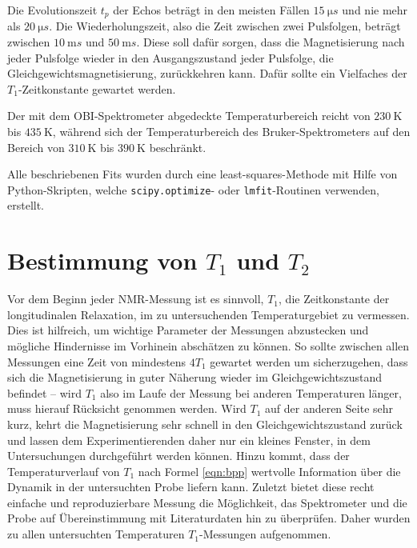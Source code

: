 Die Evolutionszeit $t_p$ der Echos beträgt in den meisten Fällen $\SI{15}{\micro s}$ und nie mehr als $\SI{20}{\micro s}$. Die Wiederholungszeit, also die Zeit zwischen zwei Pulsfolgen, beträgt zwischen $\SI{10}{\milli s}$ und $\SI{50}{\milli s}$. Diese soll dafür sorgen, dass die Magnetisierung nach jeder Pulsfolge wieder in den Ausgangszustand jeder Pulsfolge, die Gleichgewichtsmagnetisierung, zurückkehren kann. Dafür sollte ein Vielfaches der $T_1$-Zeitkonstante gewartet werden.

Der mit dem OBI-Spektrometer abgedeckte Temperaturbereich reicht von $\SI{230}{\kelvin}$ bis $\SI{435}{\kelvin}$, während sich der Temperaturbereich des Bruker-Spektrometers auf den Bereich von $\SI{310}{\kelvin}$ bis $\SI{390}{\kelvin}$ beschränkt.

Alle beschriebenen Fits wurden durch eine least-squares-Methode mit Hilfe von Python-Skripten, welche \texttt{scipy.optimize}- oder \texttt{lmfit}-Routinen verwenden, erstellt.


\section{Bestimmung von $T_1$ und $T_2$} \label{section:res:T_1}

Vor dem Beginn jeder NMR-Messung ist es sinnvoll, $T_1$, die Zeitkonstante der longitudinalen Relaxation, im zu untersuchenden Temperaturgebiet zu vermessen. Dies ist hilfreich, um wichtige Parameter der Messungen abzustecken und mögliche Hindernisse im Vorhinein abschätzen zu können. So sollte zwischen allen Messungen eine Zeit von mindestens $4 T_1$ gewartet werden um sicherzugehen, dass sich die Magnetisierung in guter Näherung wieder im Gleichgewichtszustand befindet -- wird $T_1$ also im Laufe der Messung bei anderen Temperaturen länger, muss hierauf Rücksicht genommen werden. Wird $T_1$ auf der anderen Seite sehr kurz, kehrt die Magnetisierung sehr schnell in den Gleichgewichtszustand zurück und lassen dem Experimentierenden daher nur ein kleines Fenster, in dem Untersuchungen durchgeführt werden können. Hinzu kommt, dass der Temperaturverlauf von $T_1$ nach Formel \eqref{eqn:bpp} wertvolle Information über die Dynamik in der untersuchten Probe liefern kann. Zuletzt bietet diese recht einfache und reproduzierbare Messung die Möglichkeit, das Spektrometer und die Probe auf Übereinstimmung mit Literaturdaten hin zu überprüfen. Daher wurden zu allen untersuchten Temperaturen $T_1$-Messungen aufgenommen.

